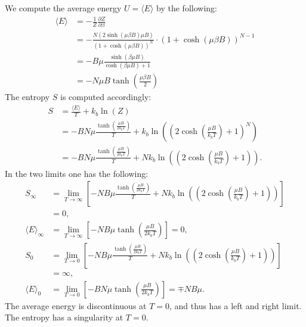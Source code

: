 \documentclass[a4paper]{article}
\newcommand{\average}[1]{\langle #1 \rangle}
\newcommand{\newparagraph}{\vspace{.5cm}\noindent}
\begin{document}
\newparagraph
\begin{comment}
\begin{align*}
    \average{E} &= -\frac{N(2\sinh(\mu\beta B)\mu B)}{(1+\cosh(\mu\beta B))^N}\cdot (1+\cosh(\mu\beta B))^{N-1}\\
    &= -\frac{N2\sinh(\mu\beta B)\mu B}{1+\cosh(\mu\beta B)}\\
    &= -N\mu B \tanh\left(\frac{\mu\beta B}{2}\right)
\end{align*}
\end{comment}
We compute the average energy $U = \average{E}$ by the following:
\begin{align*}
    \average{E} &= -\frac{1}{Z}\frac{\partial Z}{\partial \beta}\\
    &= -\frac{N(2\sinh(\mu\beta B)\mu B)}{(1+\cosh(\mu\beta B))^N}\cdot (1+\cosh(\mu\beta B))^{N-1}\\
    &= -B\mu\frac{\sinh\left(\beta\mu B\right)}{\cosh(\beta\mu B) + 1}\\
    &= -N\mu B \tanh\left(\frac{\mu\beta B}{2}\right)
\end{align*}
The entropy $S$ is computed accordingly:
\begin{align*}
    S &= \frac{\average{E}}{T} + k_b\ln\left(Z\right)\\
    &= -BN\mu\frac{\tanh\left(\frac{\mu B}{2k_bT}\right)}{T} + k_b\ln\left(\left(2\cosh\left(\frac{\mu B}{k_bT}\right) + 1\right)^N\right)\\
    &= -BN\mu\frac{\tanh\left(\frac{\mu B}{2k_bT}\right)}{T} + Nk_b\ln\left(\left(2\cosh\left(\frac{\mu B}{k_bT}\right) + 1\right)\right).
\end{align*}
In the two limits one has the following:
\begin{align*}
    S_\infty &= \lim_{T\to\infty}\left[ -NB\mu\frac{\tanh\left(\frac{\mu B}{2k_bT}\right)}{T} + Nk_b\ln\left(\left(2\cosh\left(\frac{\mu B}{k_bT}\right) + 1\right)\right)\right]\\
    &=0,\\
    \average{E}_\infty &=\lim_{T\to\infty}\left[-NB\mu\tanh\left(\frac{\mu B}{2k_bT}\right)\right] = 0,\\
    S_0 &= \lim_{T\to0}\left[ -NB\mu\frac{\tanh\left(\frac{\mu B}{2k_bT}\right)}{T} + Nk_b\ln\left(\left(2\cosh\left(\frac{\mu B}{k_bT}\right) + 1\right)\right)\right]\\
    &= \infty,\\
    \average{E}_0 &= \lim_{T\to0}\left[-BN\mu\tanh\left(\frac{\mu B}{2k_bT}\right)\right] = \mp NB\mu.
\end{align*}The average energy is discontinuous at $T=0$, and thus has a left and right limit. The entropy has a singularity at $T=0$.
\end{document}
